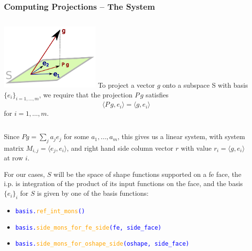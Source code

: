 \documentclass[compress]{beamer}
\begin{document}
\begin{frame}
  \frametitle{Computing Projections -- The System}
  \begin{columns}
      \includegraphics[width=5cm, height=3.33cm]{img/projection.pdf}
      To project a vector $g$ onto a subspace S with basis $\{e_i\}_{i=1,\dots,m}$, we require that the projection
      $P\,g$ satisfies
      $$\langle P\,g, e_i \rangle = \langle g, e_i \rangle$$ for $i=1,\dots,m$.
  \end{columns}
  \pause

  Since $P g = \sum_j{ a_j e_j }$ for some $a_1,\dots,a_m$, this gives us a linear system, with system matrix
  $M_{i,j} = \langle e_j, e_i \rangle$, and right hand side column vector $r$ with value
  $r_i = \langle g, e_i \rangle$ at row $i$.
  \pause
 
  For our cases, $S$ will be the space of shape functions supported on a fe face, the i.p. is integration of the product
  of its input functions on the face, and the basis $\{e_i\}_i$ for $S$ is given by one of the basis functions:
  \pause
  \begin{itemize}[<+->]
    \item \texttt{\textcolor{blue}{basis.\textcolor{orange}{ref\_int\_mons}()}} 
    \item \texttt{\textcolor{blue}{basis.\textcolor{orange}{side\_mons\_for\_fe\_side}(fe, side\_face)}}
    \item \texttt{\textcolor{blue}{basis.\textcolor{orange}{side\_mons\_for\_oshape\_side}(oshape, side\_face)}}
  \end{itemize}
\end{frame}
\end{document}
